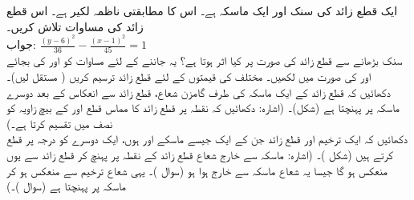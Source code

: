ایک قطع زائد کی سنک   اور ایک ماسکہ  ہے۔ اس کا مطابقتی ناظمہ لکیر  ہے۔ اس قطع زائد کی مساوات تلاش کریں۔\\
جواب:\quad
$\tfrac{(y-6)^2}{36}-\tfrac{(x-1)^2}{45}=1$
\\
سنک بڑھانے سے قطع زائد کی صورت پر کیا اثر ہوتا ہے؟ یہ جاننے کے لئے مساوات  کو  اور  کی بجائے  اور  کی صورت میں لکھیں۔ مختلف  کی قیمتوں کے لئے قطع زائد ترسیم کریں ( مستقل لیں)۔
\\
دکھائیں کہ قطع زائد کے ایک ماسکہ کی طرف گامزن شعاع، قطع زائد سے انعکاس کے بعد  دوسرے ماسکہ پر پہنچتا ہے (شکل)۔ (اشارہ: دکھائیں کہ نقطہ  پر قطع زائد کا مماس  قطع  اور  کے بیچ زاویہ کو نصف میں تقسیم کرتا ہے۔)
\\
دکھائیں کہ ایک ترخیم اور قطع زائد جن کے  ایک جیسے ماسکے  اور  ہوں، ایک دوسرے کو  درجہ پر قطع کرتے ہیں (شکل )۔ (اشارہ: ماسکہ  سے خارج شعاع قطع زائد کے نقطہ  پر پہنچ کر قطع زائد سے یوں منعکس ہو گا جیسا یہ شعاع ماسکہ  سے خارج ہوا ہو (سوال )۔ یہی شعاع ترخیم سے منعکس ہو کر ماسکہ  پر پہنچتا ہے (سوال )۔)
